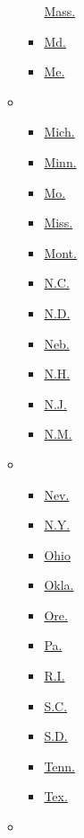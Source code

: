 \begin{itemize}
\begin{itemize}
\begin{itemize}
      \href{massachusetts.html}{Mass.}
    \item
      \href{maryland.html}{Md.}
    \item
      \href{maine.html}{Me.}
    \end{itemize}
  \item
    \begin{itemize}
    \tightlist
    \item
      \href{michigan.html}{Mich.}
    \item
      \href{minnesota.html}{Minn.}
    \item
      \href{missouri.html}{Mo.}
    \item
      \href{mississippi.html}{Miss.}
    \item
      \href{montana.html}{Mont.}
    \item
      \href{north-carolina.html}{N.C.}
    \item
      \href{north-dakota.html}{N.D.}
    \item
      \href{nebraska.html}{Neb.}
    \item
      \href{new-hampshire.html}{N.H.}
    \item
      \href{new-jersey.html}{N.J.}
    \item
      \href{new-mexico.html}{N.M.}
    \end{itemize}
  \item
    \begin{itemize}
    \tightlist
    \item
      \href{nevada.html}{Nev.}
    \item
      \href{new-york.html}{N.Y.}
    \item
      \href{ohio.html}{Ohio}
    \item
      \href{oklahoma.html}{Okla.}
    \item
      \href{oregon.html}{Ore.}
    \item
      \href{pennsylvania.html}{Pa.}
    \item
      \href{rhode-island.html}{R.I.}
    \item
      \href{south-carolina.html}{S.C.}
    \item
      \href{south-dakota.html}{S.D.}
    \item
      \href{tennessee.html}{Tenn.}
    \item
      \href{texas.html}{Tex.}
    \end{itemize}
  \item
    \begin{itemize}
    \tightlist

\end{itemize}
\end{itemize}
\end{itemize}
